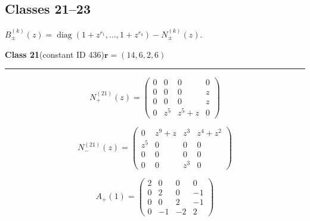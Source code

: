 \subsection*{Classes 21--23}
\noindent $B_\pm^{(k)}(z)=\operatorname{diag}(1+z^{r_1},\ldots,1+z^{r_4})-N_\pm^{(k)}(z)$.\par\medskip
\noindent\begin{minipage}{\linewidth}
\noindent\textbf{Class 21}\quad\small (constant ID 436)\hfill $\symbf{r}=(14,6,2,6)$
\par\smallskip\noindent\textcolor{rulegray}{\rule{\linewidth}{0.3pt}}
\begin{minipage}[c]{0.495\linewidth}\centering\fontsize{9.7}{12}\selectfont
\setlength{\abovedisplayskip}{4pt}\setlength{\belowdisplayskip}{4pt}
\setlength{\abovedisplayshortskip}{4pt}\setlength{\belowdisplayshortskip}{4pt}
\setlength{\arraycolsep}{3pt}\renewcommand{\arraystretch}{1.08}
\[N_{+}^{(21)}(z)=\begin{pmatrix}0 & 0 & 0 & 0\\0 & 0 & 0 & z\\0 & 0 & 0 & z\\0 & z^{5} & z^{5} + z & 0\end{pmatrix}\]
\end{minipage}%
\begin{minipage}[c]{0.495\linewidth}\centering\fontsize{9.7}{12}\selectfont
\setlength{\abovedisplayskip}{4pt}\setlength{\belowdisplayskip}{4pt}
\setlength{\abovedisplayshortskip}{4pt}\setlength{\belowdisplayshortskip}{4pt}
\setlength{\arraycolsep}{3pt}\renewcommand{\arraystretch}{1.08}
\[N_{-}^{(21)}(z)=\begin{pmatrix}0 & z^{9} + z & z^{3} & z^{4} + z^{2}\\z^{5} & 0 & 0 & 0\\0 & 0 & 0 & 0\\0 & 0 & z^{3} & 0\end{pmatrix}\]
\end{minipage}%
\par\noindent
\begin{minipage}[c]{0.495\linewidth}\centering\fontsize{9.7}{12}\selectfont
\setlength{\abovedisplayskip}{4pt}\setlength{\belowdisplayskip}{4pt}
\setlength{\abovedisplayshortskip}{4pt}\setlength{\belowdisplayshortskip}{4pt}
\setlength{\arraycolsep}{3pt}\renewcommand{\arraystretch}{1.08}
\[A_{+}(1)=\begin{pmatrix}2 & 0 & 0 & 0\\0 & 2 & 0 & -1\\0 & 0 & 2 & -1\\0 & -1 & -2 & 2\end{pmatrix}\]

\end{minipage}
\end{minipage}
